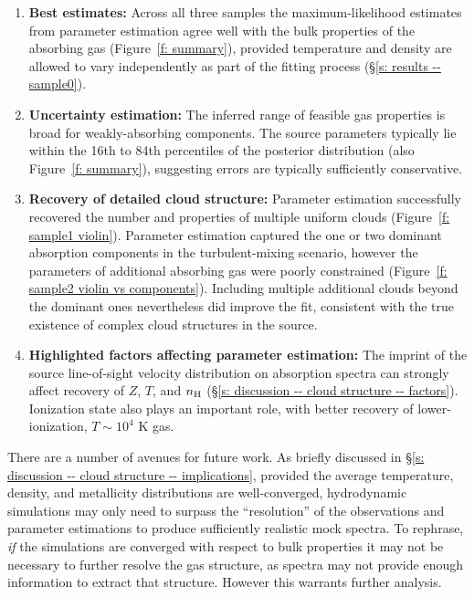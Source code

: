 \documentclass[fleqn,usenatbib]{mnras}
\begin{document}
\begin{enumerate}
    \item \textbf{Best estimates:} Across all three samples the maximum-likelihood estimates from parameter estimation agree well with the bulk properties of the absorbing gas (Figure~\ref{f: summary}), provided temperature and density are allowed to vary independently as part of the fitting process (\S\ref{s: results -- sample0}).
    \item \textbf{Uncertainty estimation:} The inferred range of feasible gas properties is broad for weakly-absorbing components. The source parameters typically lie within the 16th to 84th percentiles of the posterior distribution (also Figure~\ref{f: summary}), suggesting errors are typically sufficiently conservative.
    \item \textbf{Recovery of detailed cloud structure:} Parameter estimation successfully recovered the number and properties of multiple uniform clouds (Figure~\ref{f: sample1 violin}). Parameter estimation captured the one or two dominant absorption components in the turbulent-mixing scenario, however the parameters of additional absorbing gas were poorly constrained (Figure~\ref{f: sample2 violin vs components}). Including multiple additional clouds beyond the dominant ones nevertheless did improve the fit, consistent with the true existence of complex cloud structures in the source. 
    \item \textbf{Highlighted factors affecting parameter estimation:} The imprint of the source line-of-sight velocity distribution on absorption spectra can strongly affect recovery of $Z$, $T$, and $n_{\rm H}$ (\S\ref{s: discussion -- cloud structure -- factors}). Ionization state also plays an important role, with better recovery of lower-ionization, $T \sim 10^4$ K gas.
\end{enumerate}

There are a number of avenues for future work.
As briefly discussed in \S\ref{s: discussion -- cloud structure -- implications},
provided the average temperature, density, and metallicity distributions are well-converged,
hydrodynamic simulations may only need to surpass the ``resolution'' of the observations and parameter estimations to produce sufficiently realistic mock spectra.
To rephrase, \textit{if} the simulations are converged with respect to bulk properties it may not be necessary to further resolve the gas structure, as spectra may not provide enough information to extract that structure.
However this warrants further analysis.
\end{document}
